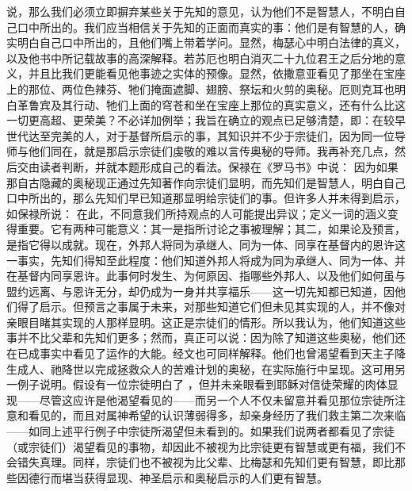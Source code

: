 说，那么我们必须立即摒弃某些关于先知的意见，认为他们不是智慧人，不明白自己口中所出的。我们应当相信关于先知的正面而真实的事：他们是有智慧的人，确实明白自己口中所出的，且他们嘴上带着学问。显然，梅瑟心中明白法律的真义，以及他书中所记载故事的高深解释。若苏厄也明白消灭二十九位君王之后分地的意义，并且比我们更能看见他事迹之实体的预像。显然，依撒意亚看见了那坐在宝座上的那位、两位色辣芬、牠们掩面遮脚、翅膀、祭坛和火剪的奥秘。厄则克耳也明白革鲁宾及其行动、牠们上面的穹苍和坐在宝座上那位的真实意义，还有什么比这一切更高超、更荣美？不必详加例举；我旨在确立的观点已足够清楚，即：在较早世代达至完美的人，对于基督所启示的事，其知识并不少于宗徒们，因为同一位导师与他们同在，就是那启示宗徒们虔敬的难以言传奥秘的导师。我再补充几点，然后交由读者判断，并就本题形成自己的看法。保禄在《罗马书》中说： 因为如果那自古隐藏的奥秘现正通过先知著作向宗徒们显明，而先知们是智慧人，明白自己口中所出的，那么先知们早已知道那显明给宗徒们的事。但许多人并未得到启示，如保禄所说： 在此，不同意我们所持观点的人可能提出异议；定义一词的涵义变得重要。它有两种可能意义：其一是指所讨论之事被理解；其二，如果论及预言，是指它得以成就。现在，外邦人将同为承继人、同为一体、同享在基督内的恩许这一事实，先知们得知至此程度：他们知道外邦人将成为同为承继人、同为一体、并在基督内同享恩许。此事何时发生、为何原因、指哪些外邦人、以及他们如何虽与盟约远离、与恩许无分，却仍成为一身并共享福乐——这一切先知都已知道，因他们得了启示。但预言之事属于未来，对那些知道它们但未见其实现的人，并不像对亲眼目睹其实现的人那样显明。这正是宗徒们的情形。所以我认为，他们知道这些事并不比父辈和先知们更多；然而，真正可以说：因为除了知道这些奥秘，他们还在已成事实中看见了运作的大能。经文也可同样解释。他们也曾渴望看到天主子降生成人、祂降世以完成拯救众人的苦难计划的奥秘，在实际施行中呈现。这可用另一例子说明。假设有一位宗徒明白了 ，但并未亲眼看到耶稣对信徒荣耀的肉体显现——尽管这应许是他渴望看见的——而另一个人不仅未留意并看见那位宗徒所注意和看见的，而且对属神希望的认识薄弱得多，却亲身经历了我们救主第二次来临——如同上述平行例子中宗徒所渴望但未看到的。如果我们说两者都看见了宗徒（或宗徒们）渴望看见的事物，却因此不被视为比宗徒更有智慧或更有福，我们不会错失真理。同样，宗徒们也不被视为比父辈、比梅瑟和先知们更有智慧，即比那些因德行而堪当获得显现、神圣启示和奥秘启示的人们更有智慧。\par

